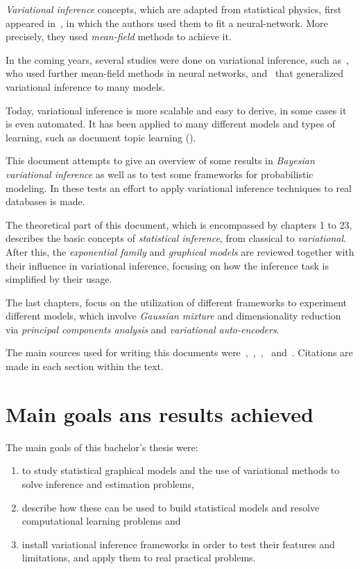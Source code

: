 
\emph{Variational inference} concepts, which are adapted from statistical physics, first appeared in~\cite{anderson1987mean}, in which the authors used them to fit a neural-network. More precisely, they used \emph{mean-field} methods to achieve it.

In the coming years, several studies were done on variational inference, such as~\cite{hinton1993keeping}, who used further mean-field methods in neural networks, and~\cite{jordan1999introduction} that generalized variational inference to many models.

Today, variational inference is more scalable and easy to derive, in some cases it is even automated. It has been applied to many different models and types of learning, such as document topic learning (\cite{blei2012probabilistic}).

This document attempts to give an overview of some results in \emph{Bayesian variational inference} as well as to test some frameworks for probabilistic modeling. In these tests an effort to apply variational inference techniques to real databases is made.

The theoretical part of this document, which is encompassed by chapters 1 to 23, describes the basic concepts of \emph{statistical inference}, from classical to \emph{variational}. After this, the \emph{exponential family} and \emph{graphical models} are reviewed together with their influence in variational inference, focusing on how the inference task is simplified by their usage.

The last chapters, focus on the utilization of different frameworks to experiment different models, which involve \emph{Gaussian mixture} and dimensionality reduction via \emph{principal components analysis} and \emph{variational auto-encoders}.

The main sources used for writing this documents were~\cite{barber},~\cite{bishop2006pattern},~\cite{koller_friedman},~\cite{masegosa2019probabilistic} and~\cite{blei2017variational}. Citations are made in each section within the text.

\section*{Main goals ans results achieved}

The main goals of this bachelor's thesis were:
\begin{enumerate}
  \item to study statistical graphical models and the use of variational methods to solve inference and estimation problems,
  \item describe how these can be used to build statistical models and resolve computational learning problems and
  \item install variational inference frameworks in order to test their features and limitations, and apply them to real practical problems.
\end{enumerate}

